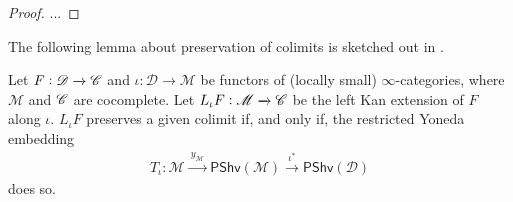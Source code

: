 \documentclass[../text]{subfiles}
\begin{document}
\begin{proof}
    ...
\end{proof}


The following lemma about preservation of colimits is sketched out in \cite{rezk2023lan}.
%
\begin{lemma}\label{lem:Lan_preserve_colim}
    Let $F: \mathscr{D} \xrightarrow{} \mathscr{C}$ and $\iota: \mathscr{D} \xrightarrow{} \mathscr{M}$ be functors of (locally small) $\infty$-categories, where $\mathscr{M}$ and $\mathscr{C}$ are cocomplete. Let $L_{\iota} F: \mathscr{M} \xrightarrow{} \mathscr{C}$ be the left Kan extension of $F$ along $\iota$. $L_{\iota} F$ preserves a given colimit if, and only if, the restricted Yoneda embedding
    \begin{align}
        T_{\iota}: \mathscr{M} \xrightarrow{\ y_{\mathscr{M}} \ } \mathsf{PShv}(\mathscr{M}) \xrightarrow{\ \iota^* \ } \mathsf{PShv}(\mathscr{D}) 
    \end{align}
    does so.
\end{lemma}
\end{document}
